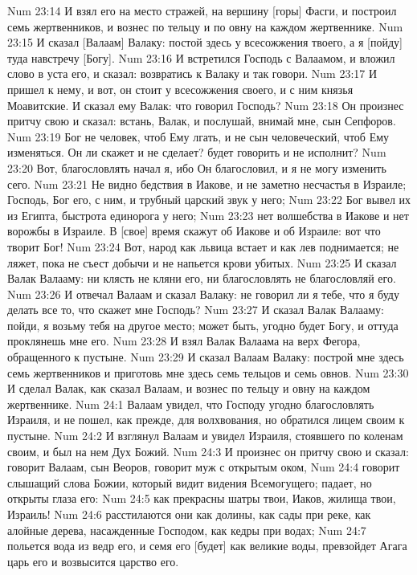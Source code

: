 Num 23:14  И взял его на место стражей, на вершину [горы] Фасги, и построил семь жертвенников, и вознес по тельцу и по овну на каждом жертвеннике.
Num 23:15  И сказал [Валаам] Валаку: постой здесь у всесожжения твоего, а я [пойду] туда навстречу [Богу].
Num 23:16  И встретился Господь с Валаамом, и вложил слово в уста его, и сказал: возвратись к Валаку и так говори.
Num 23:17  И пришел к нему, и вот, он стоит у всесожжения своего, и с ним князья Моавитские. И сказал ему Валак: что говорил Господь?
Num 23:18  Он произнес притчу свою и сказал: встань, Валак, и послушай, внимай мне, сын Сепфоров.
Num 23:19  Бог не человек, чтоб Ему лгать, и не сын человеческий, чтоб Ему изменяться. Он ли скажет и не сделает? будет говорить и не исполнит?
Num 23:20  Вот, благословлять начал я, ибо Он благословил, и я не могу изменить сего.
Num 23:21  Не видно бедствия в Иакове, и не заметно несчастья в Израиле; Господь, Бог его, с ним, и трубный царский звук у него;
Num 23:22  Бог вывел их из Египта, быстрота единорога у него;
Num 23:23  нет волшебства в Иакове и нет ворожбы в Израиле. В [свое] время скажут об Иакове и об Израиле: вот что творит Бог!
Num 23:24  Вот, народ как львица встает и как лев поднимается; не ляжет, пока не съест добычи и не напьется крови убитых.
Num 23:25  И сказал Валак Валааму: ни клясть не кляни его, ни благословлять не благословляй его.
Num 23:26  И отвечал Валаам и сказал Валаку: не говорил ли я тебе, что я буду делать все то, что скажет мне Господь?
Num 23:27  И сказал Валак Валааму: пойди, я возьму тебя на другое место; может быть, угодно будет Богу, и оттуда проклянешь мне его.
Num 23:28  И взял Валак Валаама на верх Фегора, обращенного к пустыне.
Num 23:29  И сказал Валаам Валаку: построй мне здесь семь жертвенников и приготовь мне здесь семь тельцов и семь овнов.
Num 23:30  И сделал Валак, как сказал Валаам, и вознес по тельцу и овну на каждом жертвеннике.
Num 24:1  Валаам увидел, что Господу угодно благословлять Израиля, и не пошел, как прежде, для волхвования, но обратился лицем своим к пустыне.
Num 24:2  И взглянул Валаам и увидел Израиля, стоявшего по коленам своим, и был на нем Дух Божий.
Num 24:3  И произнес он притчу свою и сказал: говорит Валаам, сын Веоров, говорит муж с открытым оком,
Num 24:4  говорит слышащий слова Божии, который видит видения Всемогущего; падает, но открыты глаза его:
Num 24:5  как прекрасны шатры твои, Иаков, жилища твои, Израиль!
Num 24:6  расстилаются они как долины, как сады при реке, как алойные дерева, насажденные Господом, как кедры при водах;
Num 24:7  польется вода из ведр его, и семя его [будет] как великие воды, превзойдет Агага царь его и возвысится царство его.
